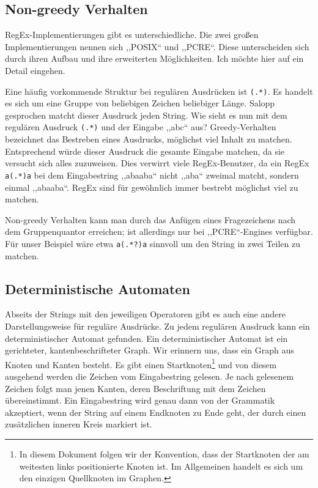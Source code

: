 \subsection{Non-greedy Verhalten}
%
RegEx-Implementierungen gibt es unterschiedliche. Die zwei großen Implementierungen nennen sich ,,POSIX`` und ,,PCRE``. Diese unterscheiden sich durch ihren Aufbau und ihre erweiterten Möglichkeiten. Ich möchte hier auf ein Detail eingehen.

Eine häufig vorkommende Struktur bei regulären Ausdrücken ist \texttt{(.*)}. Es handelt es sich um eine Gruppe von beliebigen Zeichen beliebiger Länge. Salopp gesprochen matcht dieser Ausdruck jeden String.
Wie sieht es nun mit dem regulären Ausdruck \texttt{(.*)} und der Eingabe ,,abc`` aus? Greedy-Verhalten bezeichnet das Bestreben eines Ausdrucks, möglichst viel Inhalt zu matchen. Entsprechend würde dieser Ausdruck die gesamte Eingabe matchen, da sie versucht sich alles zuzuweisen. Dies verwirrt viele RegEx-Benutzer, da ein RegEx \texttt{a(.*)a} bei dem Eingabestring ,,abaaba`` nicht ,,aba`` zweimal matcht, sondern einmal ,,abaaba``. RegEx sind für gewöhnlich immer bestrebt möglichst viel zu matchen.

Non-greedy Verhalten kann man durch das Anfügen eines Fragezeichens nach dem Gruppenquantor erreichen; ist allerdings nur bei ,,PCRE``-Engines verfügbar. Für unser Beispiel wäre etwa \texttt{a(.*?)a} sinnvoll um den String in zwei Teilen zu matchen.

\subsection{Deterministische Automaten}
%
Abseits der Strings mit den jeweiligen Operatoren gibt es auch eine andere Darstellungsweise für reguläre Ausdrücke. Zu jedem regulären Ausdruck kann ein deterministischer Automat gefunden. Ein deterministischer Automat ist ein gerichteter, kantenbeschrifteter Graph. Wir erinnern uns, dass ein Graph aus Knoten und Kanten besteht. Es gibt einen Startknoten\footnote{In diesem Dokument folgen wir der Konvention, dass der Startknoten der am weitesten links positionierte Knoten ist. Im Allgemeinen handelt es sich um den einzigen Quellknoten im Graphen.} und von diesem ausgehend werden die Zeichen vom Eingabestring gelesen. Je nach gelesenem Zeichen folgt man jenen Kanten, deren Beschriftung mit dem Zeichen übereinstimmt. Ein Eingabestring wird genau dann von der Grammatik akzeptiert, wenn der String auf einem Endknoten zu Ende geht, der durch einen zusätzlichen inneren Kreis markiert ist.

